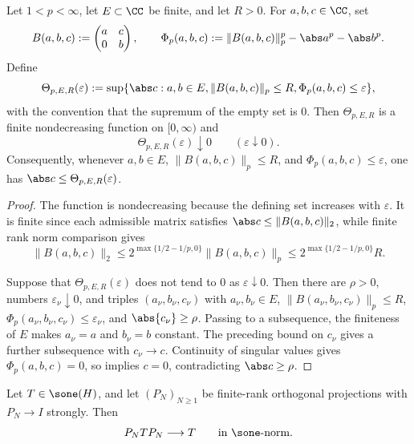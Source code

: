 \begin{lemma}
  \label{lem:uniform-two-by-two-schatten-modulus}
  Let \(1<p<\infty\), let \(E\subset\CC\) be finite, and let \(R>0\). For
  \(a,b,c\in\CC\), set
  \[
    B(a,b,c):=\begin{pmatrix}a&c\\0&b\end{pmatrix},
    \qquad
    \Phi_p(a,b,c):=\|B(a,b,c)\|_p^p-\abs a^p-\abs b^p .
  \]
  Define
  \[
    \Theta_{p,E,R}(\varepsilon)
    :=
    \sup\{\abs c:
      a,b\in E,
      \|B(a,b,c)\|_p\le R,
      \Phi_p(a,b,c)\le\varepsilon\},
  \]
  with the convention that the supremum of the empty set is \(0\). Then
  \(\Theta_{p,E,R}\) is a finite nondecreasing function on
  \([0,\infty)\) and
  \[
    \Theta_{p,E,R}(\varepsilon)\downarrow0
    \qquad(\varepsilon\downarrow0).
  \]
  Consequently, whenever \(a,b\in E\), \(\|B(a,b,c)\|_p\le R\), and
  \(\Phi_p(a,b,c)\le\varepsilon\), one has
  \(\abs c\le\Theta_{p,E,R}(\varepsilon)\).
\end{lemma}

\begin{proof}
  The function is nondecreasing because the defining set increases with
  \(\varepsilon\). It is finite since each admissible matrix satisfies
  \(\abs c\le \|B(a,b,c)\|_2\), while finite rank norm comparison gives
  \[
    \|B(a,b,c)\|_2
    \le 2^{\max\{1/2-1/p,0\}}\|B(a,b,c)\|_p
    \le 2^{\max\{1/2-1/p,0\}}R .
  \]

  Suppose that \(\Theta_{p,E,R}(\varepsilon)\) does not tend to \(0\) as
  \(\varepsilon\downarrow0\). Then there are \(\rho>0\), numbers
  \(\varepsilon_\nu\downarrow0\), and triples
  \((a_\nu,b_\nu,c_\nu)\) with \(a_\nu,b_\nu\in E\),
  \(\|B(a_\nu,b_\nu,c_\nu)\|_p\le R\),
  \(\Phi_p(a_\nu,b_\nu,c_\nu)\le\varepsilon_\nu\), and
  \(\abs{c_\nu}\ge\rho\). Passing to a subsequence, the finiteness of
  \(E\) makes \(a_\nu=a\) and \(b_\nu=b\) constant. The preceding bound on
  \(c_\nu\) gives a further subsequence with \(c_\nu\to c\). Continuity of
  singular values gives \(\Phi_p(a,b,c)=0\), so
   implies \(c=0\), contradicting
  \(\abs c\ge\rho\).
\end{proof}

\begin{lemma}
  \label{lem:trace-norm-schur-compressions}
  Let \(T\in\sone(H)\), and let \((P_N)_{N\ge1}\) be finite-rank
  orthogonal projections with \(P_N\to I\) strongly. Then
  \[
    P_NTP_N\longrightarrow T
    \qquad\text{in }\sone\text{-norm}.
  \]
\end{lemma}

